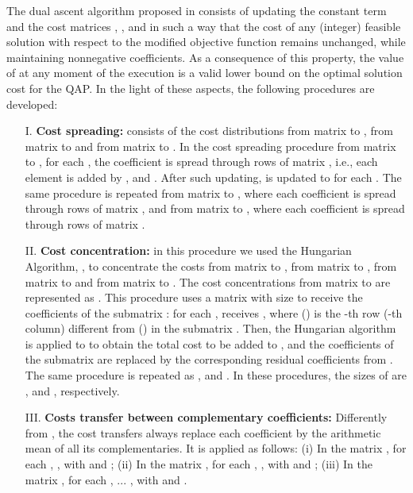 \documentclass[authoryear,12pt,a4paper,times]{elsarticle}
\begin{document}
The dual ascent algorithm  proposed in \citet{hahn2012} consists of updating the constant term 
and the cost matrices , ,  and 
in such a way that the cost of any (integer) feasible solution with respect to the modified objective function
remains unchanged, while maintaining nonnegative coefficients. 
As a consequence of this property, the value of  at any moment of the execution is a valid
lower bound on the optimal solution cost for the QAP.
In the light of these aspects, the following procedures  are  developed:

\begin{enumerate}
\item [I.]
     \textbf{Cost spreading:} consists of the cost distributions from matrix  to , from matrix  to  and from matrix  to . 
      In the cost spreading procedure  from matrix  to , for each , the  coefficient  is spread
      through  rows of matrix  , i.e., 
      each  element  is added by  ,  and .  
      After such  updating,  is updated to   for each .
      The same procedure is repeated from matrix  to , where each  coefficient   is spread
      through   rows of matrix
      , and from matrix  to , where each coefficient  is spread through  rows of matrix . 
 
\item[II.] 
     \textbf{Cost concentration:}  in this procedure we used the Hungarian Algorithm,  \cite{munkres1957}, to
     concentrate the costs from matrix  to , from matrix  to , from matrix  to  and from matrix  to .
     The cost concentrations from matrix  to  are represented as  .
     This procedure uses a  matrix  with size   to receive the  coefficients of the
     submatrix : for each ,  receives
     , where  () is the -th row (-th column) different from  () in the
     submatrix . Then, the Hungarian algorithm is applied to 
     to obtain the total cost to be added to , and the coefficients of the submatrix  are
     replaced by the corresponding residual coefficients from .
	The same procedure is repeated as  ,  
	  and .
	In these procedures,
	the sizes of  are ,  and , respectively.

\item [III.] 
    \textbf{Costs transfer between complementary coefficients:} 
      Differently from \cite{hahn2012}, the cost transfers always replace each coefficient by
      the arithmetic mean of all its complementaries. It is applied as follows: 
      (i) In the matrix , for each ,      ,  with  and ;
      (ii) In the matrix , for each ,        
                    , 
         with  and ;
      (iii) In the matrix , for each ,     ...  
           , with  and .

\end{enumerate}
\end{document}
